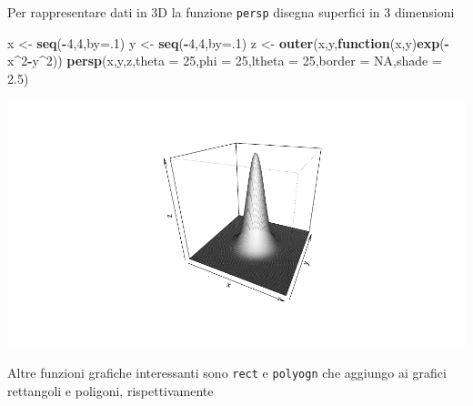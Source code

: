 \documentclass[
  11pt,
]{book}
\newenvironment{Shaded}{\begin{snugshade}}{\end{snugshade}}
\newcommand{\AttributeTok}[1]{\textcolor[rgb]{0.13,0.29,0.53}{#1}}
\newcommand{\ConstantTok}[1]{\textcolor[rgb]{0.56,0.35,0.01}{#1}}
\newcommand{\ControlFlowTok}[1]{\textcolor[rgb]{0.13,0.29,0.53}{\textbf{#1}}}
\newcommand{\DecValTok}[1]{\textcolor[rgb]{0.00,0.00,0.81}{#1}}
\newcommand{\FloatTok}[1]{\textcolor[rgb]{0.00,0.00,0.81}{#1}}
\newcommand{\FunctionTok}[1]{\textcolor[rgb]{0.13,0.29,0.53}{\textbf{#1}}}
\newcommand{\NormalTok}[1]{#1}
\newcommand{\OtherTok}[1]{\textcolor[rgb]{0.56,0.35,0.01}{#1}}
\newcommand{\SpecialCharTok}[1]{\textcolor[rgb]{0.81,0.36,0.00}{\textbf{#1}}}
\theoremstyle{mytheoremstyle}
\theoremstyle{mydefstyle}
\begin{document}
Per rappresentare dati in 3D la funzione \texttt{persp} disegna superfici in 3 dimensioni

\begin{Shaded}
\begin{Highlighting}[]
\NormalTok{x }\OtherTok{\textless{}{-}} \FunctionTok{seq}\NormalTok{(}\SpecialCharTok{{-}}\DecValTok{4}\NormalTok{,}\DecValTok{4}\NormalTok{,}\AttributeTok{by=}\NormalTok{.}\DecValTok{1}\NormalTok{)}
\NormalTok{y }\OtherTok{\textless{}{-}} \FunctionTok{seq}\NormalTok{(}\SpecialCharTok{{-}}\DecValTok{4}\NormalTok{,}\DecValTok{4}\NormalTok{,}\AttributeTok{by=}\NormalTok{.}\DecValTok{1}\NormalTok{)}
\NormalTok{z }\OtherTok{\textless{}{-}} \FunctionTok{outer}\NormalTok{(x,y,}\ControlFlowTok{function}\NormalTok{(x,y)}\FunctionTok{exp}\NormalTok{(}\SpecialCharTok{{-}}\NormalTok{x}\SpecialCharTok{\^{}}\DecValTok{2}\SpecialCharTok{{-}}\NormalTok{y}\SpecialCharTok{\^{}}\DecValTok{2}\NormalTok{))}
\FunctionTok{persp}\NormalTok{(x,y,z,}\AttributeTok{theta =} \DecValTok{25}\NormalTok{,}\AttributeTok{phi =} \DecValTok{25}\NormalTok{,}\AttributeTok{ltheta =} \DecValTok{25}\NormalTok{,}\AttributeTok{border =} \ConstantTok{NA}\NormalTok{,}\AttributeTok{shade =} \FloatTok{2.5}\NormalTok{)}
\end{Highlighting}
\end{Shaded}

\begin{center}\includegraphics{Appunti_di_Statistica_2025_files/figure-latex/24-Libro-28,-1} \end{center}

Altre funzioni grafiche interessanti sono \texttt{rect} e \texttt{polyogn}
che aggiungo ai grafici rettangoli e poligoni, rispettivamente
\end{document}
